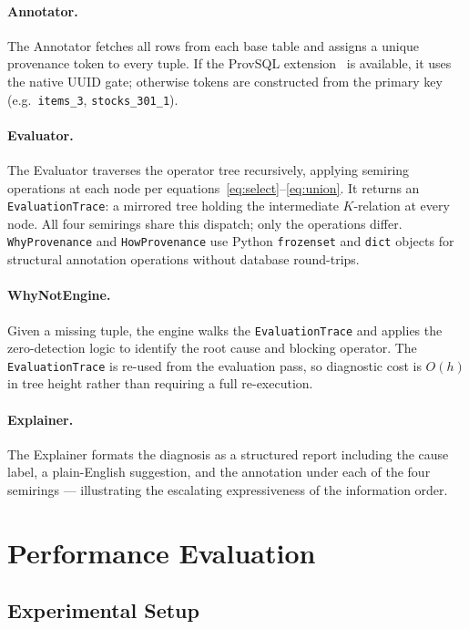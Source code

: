 \documentclass{llncs}
\begin{document}
\paragraph{Annotator.}
The Annotator fetches all rows from each base table and assigns a
unique provenance token to every tuple. If the ProvSQL
extension~\cite{Senellart2018} is available, it uses the native UUID
gate; otherwise tokens are constructed from the primary key
(e.g.\ \texttt{items\_3}, \texttt{stocks\_301\_1}).

\paragraph{Evaluator.}
The Evaluator traverses the operator tree recursively, applying semiring
operations at each node per equations~\eqref{eq:select}--\eqref{eq:union}.
It returns an \texttt{EvaluationTrace}: a mirrored tree holding the
intermediate $K$-relation at every node.
All four semirings share this dispatch; only the operations differ.
\texttt{WhyProvenance} and \texttt{HowProvenance} use Python
\texttt{frozenset} and \texttt{dict} objects for structural annotation
operations without database round-trips.

\paragraph{WhyNotEngine.}
Given a missing tuple, the engine walks the \texttt{EvaluationTrace}
and applies the zero-detection logic to identify the root cause and
blocking operator. The \texttt{EvaluationTrace} is re-used from the
evaluation pass, so diagnostic cost is $O(h)$ in tree height rather
than requiring a full re-execution.

\paragraph{Explainer.}
The Explainer formats the diagnosis as a structured report including
the cause label, a plain-English suggestion, and the annotation under
each of the four semirings --- illustrating the escalating
expressiveness of the information order.

\section{Performance Evaluation}
\label{sec:evaluation}

\subsection{Experimental Setup}
\label{sec:eval-setup}
\end{document}
